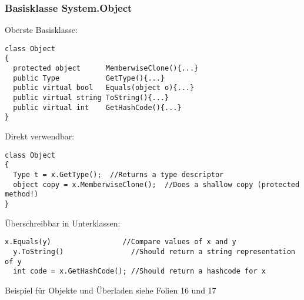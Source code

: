 \subsubsection{Basisklasse System.Object}
Oberste Basisklasse:
\begin{lstlisting}[style=Csharp]
class Object
{
  protected object      MemberwiseClone(){...}
  public Type           GetType(){...}
  public virtual bool   Equals(object o){...}
  public virtual string ToString(){...}
  public virtual int    GetHashCode(){...}
}
\end{lstlisting}
Direkt verwendbar: 
\begin{lstlisting}[style=Csharp]
class Object
{
  Type t = x.GetType();  //Returns a type descriptor
  object copy = x.MemberwiseClone();  //Does a shallow copy (protected method!)
}
\end{lstlisting}
Überschreibbar in Unterklassen: 
\begin{lstlisting}[style=Csharp]
  x.Equals(y)                 //Compare values of x and y
  y.ToString()                //Should return a string representation of y
  int code = x.GetHashCode(); //Should return a hashcode for x
\end{lstlisting}

Beispiel für Objekte und Überladen siehe Folien 16 und 17
